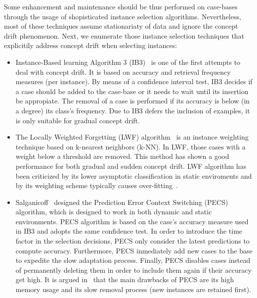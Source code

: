 \documentclass[preprint,12pt]{elsarticle}
\begin{document}
Some enhancement and maintenance should be thus performed on case-bases through the usage of shopisticated instance selection algorithms. Nevertheless, most of these techniques assume stationariaty of data and ignore the concept drift phenomenon. Next, we enumerate those instance selection techniques that explicitily address concept drift when selecting instances:

\begin{itemize}
	\item Instance-Based learning Algorithm 3 (IB3)~\cite{aha91} is one of the first attempts to deal with concept drift. It is based on accuracy and retrieval frequency measures (per instance). By means of a confidence interval test, IB3 decides if a case should be added to the case-base or it needs to wait until its insertion be appropiate. 
The removal of a case is performed if its accuracy is below (in a degree) its class's frequency. Due to IB3 defers the inclusion of examples, it is only suitable for gradual concept drift. 
	\item The Locally Weighted Forgetting (LWF) algorithm~\cite{salga93} is an instance weighting technique based on k-nearest neighbors (k-NN). In LWF, those cases with a weight below a threshold are removed. This method has shown a good performance for both gradual and sudden concept drift. LWF algorithm has been criticized by its lower asymptotic classification in static enviroments and by its weighting scheme typically causes over-fitting~\cite{klinken04}.
	\item Salganicoff~\cite{salga97} designed the Prediction Error Context Switching (PECS) algorithm, which is designed to work in both dynamic and static environments. PECS algorithm is based on the case's accuracy measure used in IB3 and adopts the same confidence test. In order to introduce the time factor in the selection decisions, PECS only consider the latest predictions to compute accuracy. Furthermore, PECS inmediately add new cases to the base to expedite the slow adaptation process. Finally, PECS disables cases instead of permanently deleting them in order to include them again if their accuracy get high. It is argued in~\cite{berin07} that the main drawbacks of PECS are its high memory usage and its slow removal process (new instances are retained first).

\end{itemize}
\end{document}
